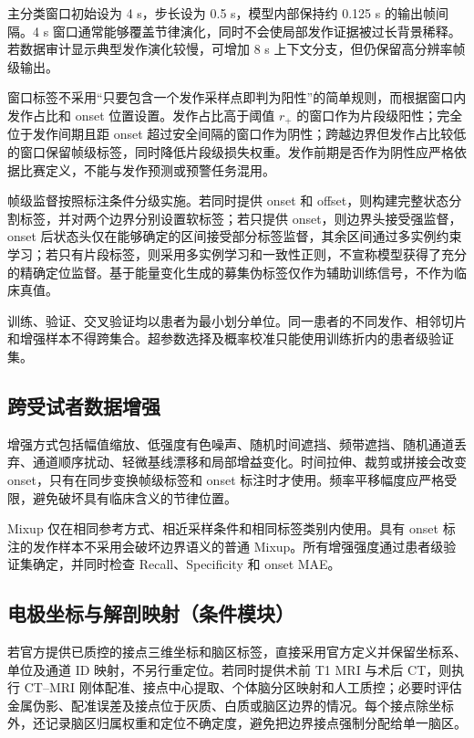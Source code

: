 \documentclass{cumcmthesis}
\numberwithin{figure}{section} %
\numberwithin{table}{section} %
\begin{document}
主分类窗口初始设为 4 s，步长设为 0.5 s，模型内部保持约 0.125 s 的输出帧间隔。4 s 窗口通常能够覆盖节律演化，同时不会使局部发作证据被过长背景稀释。若数据审计显示典型发作演化较慢，可增加 8 s 上下文分支，但仍保留高分辨率帧级输出。

窗口标签不采用“只要包含一个发作采样点即判为阳性”的简单规则，而根据窗口内发作占比和 onset 位置设置。发作占比高于阈值 $r_+$ 的窗口作为片段级阳性；完全位于发作间期且距 onset 超过安全间隔的窗口作为阴性；跨越边界但发作占比较低的窗口保留帧级标签，同时降低片段级损失权重。发作前期是否作为阴性应严格依据比赛定义，不能与发作预测或预警任务混用。

帧级监督按照标注条件分级实施。若同时提供 onset 和 offset，则构建完整状态分割标签，并对两个边界分别设置软标签；若只提供 onset，则边界头接受强监督，onset 后状态头仅在能够确定的区间接受部分标签监督，其余区间通过多实例约束学习；若只有片段标签，则采用多实例学习和一致性正则，不宣称模型获得了充分的精确定位监督。基于能量变化生成的募集伪标签仅作为辅助训练信号，不作为临床真值。

训练、验证、交叉验证均以患者为最小划分单位。同一患者的不同发作、相邻切片和增强样本不得跨集合。超参数选择及概率校准只能使用训练折内的患者级验证集。

\subsection{跨受试者数据增强}

增强方式包括幅值缩放、低强度有色噪声、随机时间遮挡、频带遮挡、随机通道丢弃、通道顺序扰动、轻微基线漂移和局部增益变化。时间拉伸、裁剪或拼接会改变 onset，只有在同步变换帧级标签和 onset 标注时才使用。频率平移幅度应严格受限，避免破坏具有临床含义的节律位置。

Mixup 仅在相同参考方式、相近采样条件和相同标签类别内使用。具有 onset 标注的发作样本不采用会破坏边界语义的普通 Mixup。所有增强强度通过患者级验证集确定，并同时检查 Recall、Specificity 和 onset MAE。

\subsection{电极坐标与解剖映射（条件模块）}

若官方提供已质控的接点三维坐标和脑区标签，直接采用官方定义并保留坐标系、单位及通道 ID 映射，不另行重定位。若同时提供术前 T1 MRI 与术后 CT，则执行 CT–MRI 刚体配准、接点中心提取、个体脑分区映射和人工质控；必要时评估金属伪影、配准误差及接点位于灰质、白质或脑区边界的情况。每个接点除坐标外，还记录脑区归属权重和定位不确定度，避免把边界接点强制分配给单一脑区。
\end{document}
